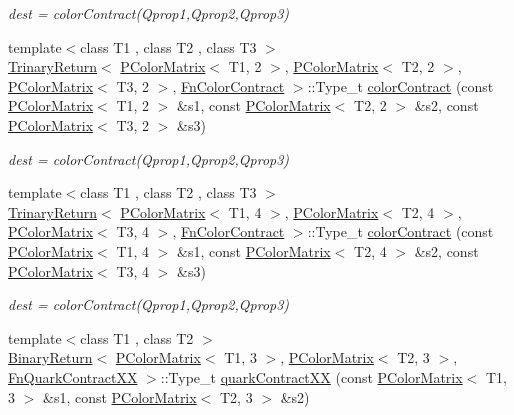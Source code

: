 \begin{DoxyCompactItemize}
\begin{DoxyCompactList}\small\item\em dest = color\+Contract(\+Qprop1,\+Qprop2,\+Qprop3) \end{DoxyCompactList}\item 
{\footnotesize template$<$class T1 , class T2 , class T3 $>$ }\\\mbox{\hyperlink{structENSEM_1_1TrinaryReturn}{Trinary\+Return}}$<$ \mbox{\hyperlink{classENSEM_1_1PColorMatrix}{P\+Color\+Matrix}}$<$ T1, 2 $>$, \mbox{\hyperlink{classENSEM_1_1PColorMatrix}{P\+Color\+Matrix}}$<$ T2, 2 $>$, \mbox{\hyperlink{classENSEM_1_1PColorMatrix}{P\+Color\+Matrix}}$<$ T3, 2 $>$, \mbox{\hyperlink{structENSEM_1_1FnColorContract}{Fn\+Color\+Contract}} $>$\+::Type\+\_\+t \mbox{\hyperlink{group__primcolormatrix_gacaff55b3cd1b6aafb43249af3ac16ea9}{color\+Contract}} (const \mbox{\hyperlink{classENSEM_1_1PColorMatrix}{P\+Color\+Matrix}}$<$ T1, 2 $>$ \&s1, const \mbox{\hyperlink{classENSEM_1_1PColorMatrix}{P\+Color\+Matrix}}$<$ T2, 2 $>$ \&s2, const \mbox{\hyperlink{classENSEM_1_1PColorMatrix}{P\+Color\+Matrix}}$<$ T3, 2 $>$ \&s3)
\begin{DoxyCompactList}\small\item\em dest = color\+Contract(\+Qprop1,\+Qprop2,\+Qprop3) \end{DoxyCompactList}\item 
{\footnotesize template$<$class T1 , class T2 , class T3 $>$ }\\\mbox{\hyperlink{structENSEM_1_1TrinaryReturn}{Trinary\+Return}}$<$ \mbox{\hyperlink{classENSEM_1_1PColorMatrix}{P\+Color\+Matrix}}$<$ T1, 4 $>$, \mbox{\hyperlink{classENSEM_1_1PColorMatrix}{P\+Color\+Matrix}}$<$ T2, 4 $>$, \mbox{\hyperlink{classENSEM_1_1PColorMatrix}{P\+Color\+Matrix}}$<$ T3, 4 $>$, \mbox{\hyperlink{structENSEM_1_1FnColorContract}{Fn\+Color\+Contract}} $>$\+::Type\+\_\+t \mbox{\hyperlink{group__primcolormatrix_ga2cd5ca8c1ac1d4fbf5c4d27665ccb996}{color\+Contract}} (const \mbox{\hyperlink{classENSEM_1_1PColorMatrix}{P\+Color\+Matrix}}$<$ T1, 4 $>$ \&s1, const \mbox{\hyperlink{classENSEM_1_1PColorMatrix}{P\+Color\+Matrix}}$<$ T2, 4 $>$ \&s2, const \mbox{\hyperlink{classENSEM_1_1PColorMatrix}{P\+Color\+Matrix}}$<$ T3, 4 $>$ \&s3)
\begin{DoxyCompactList}\small\item\em dest = color\+Contract(\+Qprop1,\+Qprop2,\+Qprop3) \end{DoxyCompactList}\item 
{\footnotesize template$<$class T1 , class T2 $>$ }\\\mbox{\hyperlink{structENSEM_1_1BinaryReturn}{Binary\+Return}}$<$ \mbox{\hyperlink{classENSEM_1_1PColorMatrix}{P\+Color\+Matrix}}$<$ T1, 3 $>$, \mbox{\hyperlink{classENSEM_1_1PColorMatrix}{P\+Color\+Matrix}}$<$ T2, 3 $>$, \mbox{\hyperlink{structENSEM_1_1FnQuarkContractXX}{Fn\+Quark\+Contract\+XX}} $>$\+::Type\+\_\+t \mbox{\hyperlink{group__primcolormatrix_ga2253a81d9cf66ad41a9c2426ef5a8b84}{quark\+Contract\+XX}} (const \mbox{\hyperlink{classENSEM_1_1PColorMatrix}{P\+Color\+Matrix}}$<$ T1, 3 $>$ \&s1, const \mbox{\hyperlink{classENSEM_1_1PColorMatrix}{P\+Color\+Matrix}}$<$ T2, 3 $>$ \&s2)

\end{DoxyCompactItemize}

